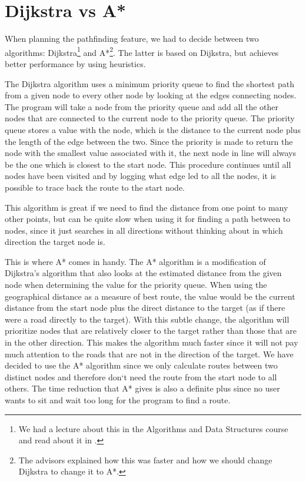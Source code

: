 \section{Dijkstra vs A*}
\label{IMPL-DVA}
When planning the pathfinding feature, we had to decide between two algorithms:
Dijkstra\footnote{We had a lecture about this in the Algorithms and Data
Structures course and read about it in \cite[p.~???]{algs4}.} and
A*\footnote{The advisors explained how this was faster and how we should
change Dijkstra to change it to A*.}. The latter is based on Dijkstra, but
achieves better performance by using heuristics.

The Dijkstra algorithm uses a minimum priority queue to find the shortest path
from a given node to every other node by looking at the edges connecting nodes.
The program will take a node from the priority queue and add all the other nodes
that are connected to the current node to the priority queue. The priority queue
stores a value with the node, which is the distance to the current node
plus the length of the edge between the two. Since the priority is made to return
the node with the smallest value associated with it, the next node in line will
always be the one which is closest to the start node. This procedure continues
until all nodes have been visited and by logging what edge led to all the nodes,
it is possible to trace back the route to the start node.

This algorithm is great if we need to find the distance from one point to many other
points, but can be quite slow when using it for finding a path between to nodes,
since it just searches in all directions without thinking about in which direction the
target node is.

This is where A* comes in handy. The A* algorithm is a modification of Dijkstra's
algorithm that also looks at the estimated distance from the given node when
determining the value for the priority queue. When using the geographical distance
as a measure of best route, the value would be the current distance from the start
node plus the direct distance to the target (as if there were a road directly to
the target). With this subtle change, the algorithm will prioritize nodes that are
relatively closer to the target rather than those that are in the other
direction. This makes the algorithm much faster since it will not pay much attention
to the roads that are not in the direction of the target.
We have decided to use the A* algorithm since we only calculate routes between
two distinct nodes and therefore don`t need the route from the start node to all
others. The time reduction that A* gives is also a definite plus since no user
wants to sit and wait too long for the program to find a route.

